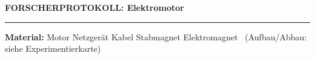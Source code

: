 \documentclass[10pt, a4paper]{article}
\begin{document}

\begin{center}
    {\large\bfseries\textcolor{fachfarbe}{FORSCHERPROTOKOLL: Elektromotor}}
\end{center}
\vspace{-0.4em}
\hrule
\vspace{0.3em}


\begin{materialbox}
\small\textbf{Material:} Motor \textbullet{} Netzgerät \textbullet{} Kabel \textbullet{} Stabmagnet \textbullet{} Elektromagnet ~{\footnotesize(Aufbau/Abbau: siehe Experimentierkarte)}
\end{materialbox}

\end{document}
